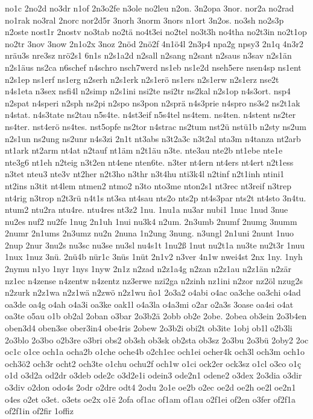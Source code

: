 {no1c
2no2d
no3dr
n1of
2n3o2fe
n3ole
no2leu
n2on.
3n2opa
3nor.
nor2a
no2rad
no1rak
no3ral
2norc
nor2d5r
3norh
3norm
3nors
n1ort
3n2os.
no3sh
no2s3p
n2oste
nost1r
2nostv
no3tab
no2tä
no4t3ei
no2tel
no3t3h
no4tha
no2t3in
no2t1op
no2tr
3nov
3now
2n1o2x
3noz
2nöd
2nö2f
4n1ö4l
2n3p4
npa2g
npsy3
2n1q
4n3r2
nräu3s
nre3sz
nrö2s1
6n1s
n2s1a2d
n2sall
n2sang
n2sant
n2saus
n3sav
n2s1än
n2s1äus
ns2ca
n6schef
n4schro
nsch7werd
ns1eb
ns1e2d
nseh5ere
nsen4sp
ns1ent
n2s1ep
ns1erf
ns1erg
n2serh
n2s1erk
n2s1erö
ns1ers
n2s1erw
n2s1erz
nse2t
n4s1eta
n3sex
nsfi4l
n2simp
n2s1ini
nsi2te
nsi2tr
ns2kal
n2s1op
n4s3ort.
nsp4
n2spat
n4speri
n2sph
ns2pi
n2spo
ns3pon
n2sprä
n4s3prie
n4spro
ns3s2
ns2t1ak
n4stat.
n4s3tate
ns2tau
n5s4te.
n4st3eif
n5s4tel
ns4tem.
ns4ten.
n4stent
ns2ter
ns4ter.
nst4erö
ns4tes.
nst5opfe
ns2tor
n4strac
ns2tum
nst2ü
nstü1b
n2sty
ns2um
n2s1un
ns2ung
ns2unr
n4s3zi
2n1t
nt3abs
n3t2a3c
n3t2al
nta3m
n4tanza
nt2arb
nt1ark
nt2arm
nt4at
n2tauf
nt1äm
n2t1äu
n3te.
nte3au
nte2b
nt1ebe
nte1e
nte3g6
nt1eh
n2teig
n3t2en
nt4ene
nten6te.
n3ter
nt4ern
nt4ers
nt4ert
n2t1ess
n3tet
nteu3
nte3v
nt2her
n2t3ho
n3thr
n3t4hu
nti3k4l
n2tinf
n2t1inh
ntini1
nt2ins
n3tit
nt4lem
ntmen2
ntmo2
n3to
nto3me
nton2s1
nt3rec
nt3reif
n3trep
nt4rig
n3trop
n2t3rü
n4t1s
nt3sa
nt4sau
nts2o
nts2p
nt4s3par
nts2t
nt4sto
3n4tu.
ntum2
ntu2ra
ntu4re.
ntu4res
nt3z2
1nu.
1nu1a
nu3ar
nubi1
1nuc
1nud
3nue
nu2es
nuf2
nu2fe
1nug
2n1uh
1nui
nu3k4
n2um.
2n3umb
2numf
2numg
3numm
2numr
2n1ums
2n3umz
nu2n
2nuna
1n2ung
3nung.
n3ungl
2n1uni
2nunt
1nuo
2nup
2nur
3nu2s
nu3sc
nu3se
nu3sl
nu4s1t
1nu2ß
1nut
nu2t1a
nu3te
nu2t3r
1nuu
1nux
1nuz
3nü.
2nü4b
nür1c
3nüs
1nüt
2n1v2
n3ver
4n1w
nwei4st
2nx
1ny.
1nyh
2nymu
n1yo
1nyr
1nys
1nyw
2n1z
n2zad
n2z1a4g
n2zan
n2z1au
n2z1än
n2zär
nz1ec
n4zense
n4zentw
n4zentz
nz3erwe
nzi2ga
n2zinh
nz1ini
n2zor
nz2öl
nzug2s
n2zurk
n2z1wa
n2z1wä
n2zwö
n2z1wu
ño1
2o3a2
o4abi
o4ac
oa3che
oa3chi
o4ad
oa3de
oa4g
o4ah
o4a3i
oa3ke
oak1l
o4a3la
o4a3mi
o2ar
o2a3s
3oase
oa4si
o4at
oa3te
o5au
o1b
ob2al
2oban
o3bar
2o3b2ä
2obb
ob2e
2obe.
2obea
ob3ein
2o3b4en
oben3d4
oben3se
ober3in4
obe4ris
2obew
2o3b2i
obi2t
ob3ite
1obj
ob1l
o2b3li
2o3blo
2o3bo
o2b3re
o3bri
obs2
ob3sh
ob3sk
ob2sta
ob3sz
2o3bu
2o3bü
2oby2
2oc
oc1c
o1ce
och1a
ocha2b
o1che
oche4b
o2ch1ec
och1ei
ocher4k
och3l
och3m
och1o
och3ö2
och3r
ocht2
och3te
o1chu
ochu2f
och1w
o1ci
ock2er
ock3sz
o1cl
o3co
o1ç
o1d
o3d2a
od2dr
o3deb
ode2c
o3d2e1i
odein3
ode2n1
odene2
o3dex
2o3dia
o3dir
o3div
o2don
odo4s
2odr
o2dre
odt4
2odu
2o1e
oe2b
o2ec
oe2d
oe2h
oe2l
oe2n1
o4es
o2et
o3et.
o3ets
oe2x
o1ë
2ofa
of1ac
of1am
of1au
o2f1ei
of2en
o3fer
of2f1a
of2f1in
of2fir
1offiz
}
